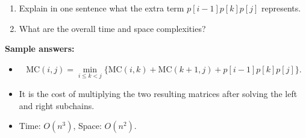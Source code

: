 \documentclass[11pt]{article}
\begin{document}
\begin{enumerate}[leftmargin=0pt, itemindent=1.7em, itemsep=1.2em]
\begin{enumerate}[label=(\alph*), leftmargin=2em, itemsep=0.9em]
\vspace{1.3cm}

\item Explain in one sentence what the extra term $p[i-1]p[k]p[j]$ represents.

\vspace{1.2cm}

\item What are the overall time and space complexities?

\vspace{1.0cm}
\end{enumerate}

\ifanswers
\textbf{Sample answers:}
\begin{itemize}
    \item
    \[
    \mathrm{MC}(i,j)=\min_{i\le k<j}\{\mathrm{MC}(i,k)+\mathrm{MC}(k+1,j)+p[i-1]p[k]p[j]\}.
    \]
    \item It is the cost of multiplying the two resulting matrices after solving the left and right subchains.
    \item Time: $O(n^3)$, Space: $O(n^2)$.
\end{itemize}
\fi

\end{enumerate}
\end{document}
